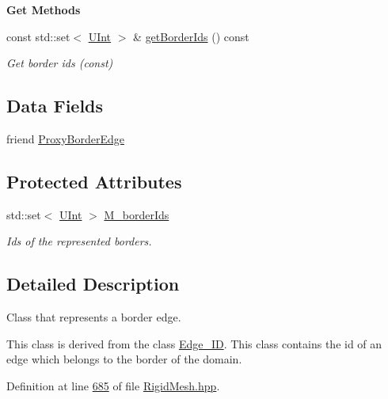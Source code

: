 \begin{Indent}{\bf Get Methods}\par
\begin{DoxyCompactItemize}
\item 
const std\+::set$<$ \hyperlink{namespaceFVCode3D_a4bf7e328c75d0fd504050d040ebe9eda}{U\+Int} $>$ \& \hyperlink{classFVCode3D_1_1Rigid__Mesh_1_1Border__Edge_ae0c4fec80ff33ad9eb08dc5aee5213b1}{get\+Border\+Ids} () const 
\begin{DoxyCompactList}\small\item\em Get border ids (const) \end{DoxyCompactList}\end{DoxyCompactItemize}
\end{Indent}
\subsection*{Data Fields}
\begin{DoxyCompactItemize}
\item 
friend \hyperlink{classFVCode3D_1_1Rigid__Mesh_1_1Border__Edge_a189ee28caab235105a5112a5d8fc9953}{Proxy\+Border\+Edge}
\end{DoxyCompactItemize}
\subsection*{Protected Attributes}
\begin{DoxyCompactItemize}
\item 
std\+::set$<$ \hyperlink{namespaceFVCode3D_a4bf7e328c75d0fd504050d040ebe9eda}{U\+Int} $>$ \hyperlink{classFVCode3D_1_1Rigid__Mesh_1_1Border__Edge_a2dae62d2ca3357296618f45f5a58e81e}{M\+\_\+border\+Ids}
\begin{DoxyCompactList}\small\item\em Ids of the represented borders. \end{DoxyCompactList}\end{DoxyCompactItemize}


\subsection{Detailed Description}
Class that represents a border edge. 

This class is derived from the class \hyperlink{classFVCode3D_1_1Rigid__Mesh_1_1Edge__ID}{Edge\+\_\+\+ID}. This class contains the id of an edge which belongs to the border of the domain. 

Definition at line \hyperlink{RigidMesh_8hpp_source_l00685}{685} of file \hyperlink{RigidMesh_8hpp_source}{Rigid\+Mesh.\+hpp}.



